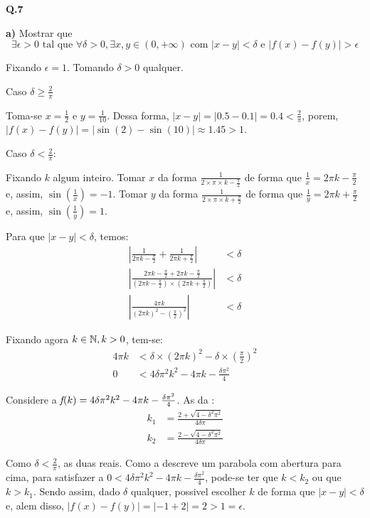 \textbf{Q.7}

\textbf{a)} Mostrar que 
$$\exists \epsilon > 0 \text{ tal que } \forall \delta > 0, \exists x,y \in (0,+\infty) \text{ com } |x-y| < \delta \text{ e } |f(x) - f(y)| > \epsilon$$

Fixando $\epsilon = 1$. Tomando $\delta > 0$ qualquer.

Caso $\delta \ge \frac{2}{\pi}$

Toma-se $x=\frac{1}{2}$ e $y=\frac{1}{10}$. Dessa forma, $|x-y| = |0.5-0.1| = 0.4 < \frac{2}{\pi}$, porem, $|f(x) - f(y)| = |\sin(2) - \sin(10)| \approx 1.45 > 1$.

Caso $\delta < \frac{2}{\pi}$:

Fixando $k$ algum inteiro. Tomar $x$ da forma $\frac{1}{2\times\pi\times k - \frac{\pi}{2}}$ de forma que \mbox{$\frac{1}{x} = 2\pi k - \frac{\pi}{2}$} e, assim, $\sin(\frac{1}{x}) = -1$. Tomar $y$ da forma $\frac{1}{2\times\pi\times k + \frac{\pi}{2}}$ de forma que $\frac{1}{y} = 2\pi k + \frac{\pi}{2}$ e, assim, $\sin(\frac{1}{y}) = 1$.

Para que $|x-y| < \delta$, temos:
\begin{align*}
|\frac{1}{2\pi k - \frac{\pi}{2}} + \frac{1}{2\pi k + \frac{\pi}{2}}| &< \delta \\
|\frac{2\pi k - \frac{\pi}{2} + 2\pi k - \frac{\pi}{2}}{(2\pi k - \frac{\pi}{2})\times(2\pi k + \frac{\pi}{2})}| &< \delta \\
|\frac{4\pi k}{(2\pi k)^2 - (\frac{\pi}{2})^2}| &< \delta
\end{align*}

Fixando agora $k \in \mathbb{N}, k>0$, tem-se:
\begin{align*}
	4\pi k &< \delta\times (2\pi k)^2 - \delta\times(\frac{\pi}{2})^2 \\
	0 &< 4\delta\pi^2 k^2 - 4\pi k - \frac{\delta\pi^2}{4} 
\end{align*}

Considere a \funcao $\mkern-2mu f\mkern-3mu(k) = 4\delta\pi^2 k^2 - 4\pi k - \frac{\delta\pi^2}{4}$. As \raizes da \funcao \sao:
\begin{align*}
	k_1 &= \frac{2 + \sqrt{4 - \delta^2\pi^2}}{4\delta\pi}\\
	k_2 &= \frac{2 - \sqrt{4 - \delta^2\pi^2}}{4\delta\pi}
\end{align*}

Como $\delta < \frac{2}{\pi}$, as duas \raizes \sao reais. Como a \funcao descreve um parabola com abertura para cima, para satisfazer a \inequacao $0 < 4\delta\pi^2 k^2 - 4\pi k - \frac{\delta\pi^2}{4}$, pode-se ter que $k < k_2$ ou que $k > k_1$. Sendo assim, dado $\delta$ qualquer, \eh possivel escolher $k$ de forma que $|x-y| < \delta$ e, alem disso, $|f(x)-f(y)| = |-1 + 2| = 2 > 1 = \epsilon$.

